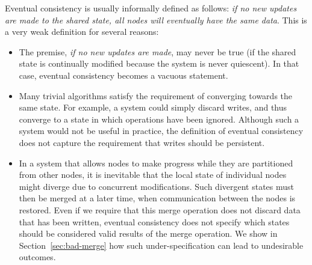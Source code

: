 Eventual consistency is usually informally defined as follows: \emph{if no new updates are made to the shared state, all nodes will eventually have the same data}.
This is a very weak definition for several reasons:
\begin{itemize}
\item The premise, \emph{if no new updates are made}, may never be true (if the shared state is continually modified because the system is never quiescent).
In that case, eventual consistency becomes a vacuous statement.

\item Many trivial algorithms satisfy the requirement of converging towards the same state.
For example, a system could simply discard writes, and thus converge to a state in which operations have been ignored.
Although such a system would not be useful in practice, the definition of eventual consistency does not capture the requirement that writes should be persistent.

\item In a system that allows nodes to make progress while they are partitioned from other nodes, it is inevitable that the local state of individual nodes might diverge due to concurrent modifications.
Such divergent states must then be merged at a later time, when communication between the nodes is restored.
Even if we require that this merge operation does not discard data that has been written, eventual consistency does not specify which states should be considered valid results of the merge operation.
We show in Section~\ref{sec:bad-merge} how such under-specification can lead to undesirable outcomes.
\end{itemize}
